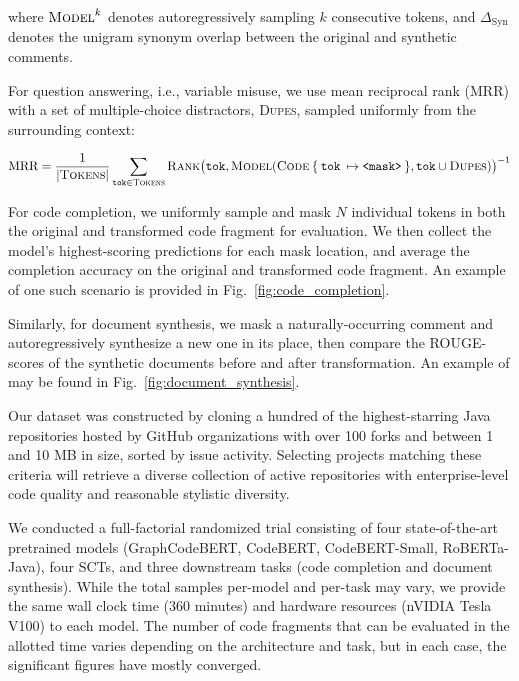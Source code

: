 \documentclass[usenames,dvipsnames]{article} %
\begin{document}
  where $\textsc{Model}^{k}$ denotes autoregressively sampling $k$ consecutive tokens, and $\Delta_\text{Syn}$ denotes the unigram synonym overlap between the original and synthetic comments.

  For question answering, i.e., variable misuse, we use mean reciprocal rank (MRR) with a set of multiple-choice distractors, \textsc{Dupes}, sampled uniformly from the surrounding context:

  \begin{equation*}
    \text{MRR} = \frac{1}{|\textsc{Tokens}|} \sum_{\texttt{tok}\in\textsc{Tokens}} \textsc{Rank}\big(\texttt{tok}, \textsc{Model}(\textsc{Code}\:\{\:\texttt{tok}\:\mapsto\texttt{<mask>}\:\}, \texttt{tok}\cup\textsc{Dupes})\big)^{-1}
  \end{equation*}

  For code completion, we uniformly sample and mask $N$ individual tokens in both the original and transformed code fragment for evaluation. We then collect the model's highest-scoring predictions for each mask location, and average the completion accuracy on the original and transformed code fragment. An example of one such scenario is provided in Fig.~\ref{fig:code_completion}.

  Similarly, for document synthesis, we mask a naturally-occurring comment and autoregressively synthesize a new one in its place, then compare the ROUGE-scores of the synthetic documents before and after transformation. An example of may be found in Fig.~\ref{fig:document_synthesis}.

  Our dataset was constructed by cloning a hundred of the highest-starring Java repositories hosted by GitHub organizations with over 100 forks and between 1 and 10 MB in size, sorted by issue activity. Selecting projects matching these criteria will retrieve a diverse collection of active repositories with enterprise-level code quality and reasonable stylistic diversity.

  We conducted a full-factorial randomized trial consisting of four state-of-the-art pretrained models (GraphCodeBERT, CodeBERT, CodeBERT-Small, RoBERTa-Java), four SCTs, and three downstream tasks (code completion and document synthesis). While the total samples per-model and per-task may vary, we provide the same wall clock time (360 minutes) and hardware resources (nVIDIA Tesla V100) to each model. The number of code fragments that can be evaluated in the allotted time varies depending on the architecture and task, but in each case, the significant figures have mostly converged.
\end{document}
